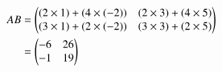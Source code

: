 \begin{align}
AB&=\begin{pmatrix}(2 \times 1) +(4 \times (-2)) &(2 \times 3) +(4 \times 5)\\(3 \times 1) +(2 \times (-2)) &(3 \times 3) +(2 \times 5)\end{pmatrix}\\
&=\begin{pmatrix}-6 &26\\-1 &19\end{pmatrix}
\end{align}
